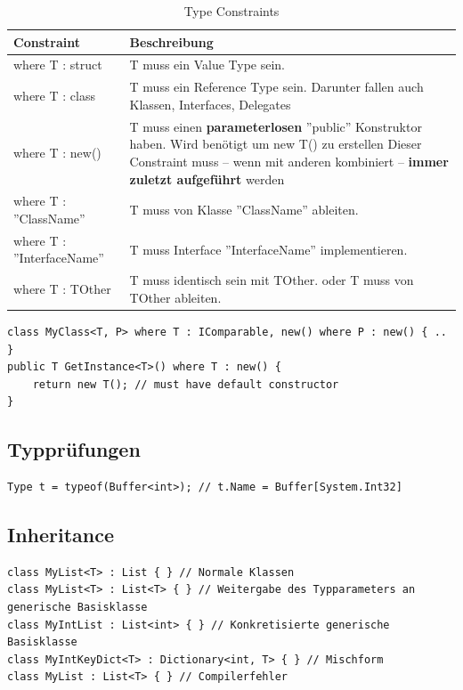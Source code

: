 \documentclass[
a4paper,
oneside,
10pt,
fleqn,
headsepline,
toc=listofnumbered, 
bibliography=totocnumbered]{scrartcl}
\begin{document}
\begin{table}[h]
	\centering
	\begin{tabu} to \linewidth {l X}
		\toprule 
		Constraint & Beschreibung \\
		\midrule
		where T : struct & T muss ein Value Type sein. \\
		where T : class & T muss ein Reference Type sein. Darunter fallen auch Klassen, Interfaces, Delegates \\
		where T : new() & T muss einen \textbf{parameterlosen} ''public'' Konstruktor haben. Wird benötigt um new T() zu erstellen
		Dieser Constraint muss – wenn mit anderen kombiniert – \textbf{immer zuletzt 
		aufgeführt} werden  \\
		where T : ''ClassName'' & T muss von Klasse ''ClassName'' ableiten. \\
		where T : ''InterfaceName'' & T muss Interface ''InterfaceName'' implementieren. \\
		where T : TOther & T muss identisch sein mit TOther.
		oder
		T muss von TOther ableiten.  \\
		\bottomrule
	\end{tabu} 
	\caption{Type Constraints}
\end{table}
\begin{lstlisting}
class MyClass<T, P> where T : IComparable, new() where P : new() { .. }
public T GetInstance<T>() where T : new() {
	return new T(); // must have default constructor
}
\end{lstlisting}

\subsection{Typprüfungen}
\begin{lstlisting}
Type t = typeof(Buffer<int>); // t.Name = Buffer[System.Int32]
\end{lstlisting}

\subsection{Inheritance}

\begin{lstlisting}
class MyList<T> : List { } // Normale Klassen
class MyList<T> : List<T> { } // Weitergabe des Typparameters an generische Basisklasse
class MyIntList : List<int> { } // Konkretisierte generische Basisklasse
class MyIntKeyDict<T> : Dictionary<int, T> { } // Mischform
class MyList : List<T> { } // Compilerfehler
\end{lstlisting}
\end{document}
